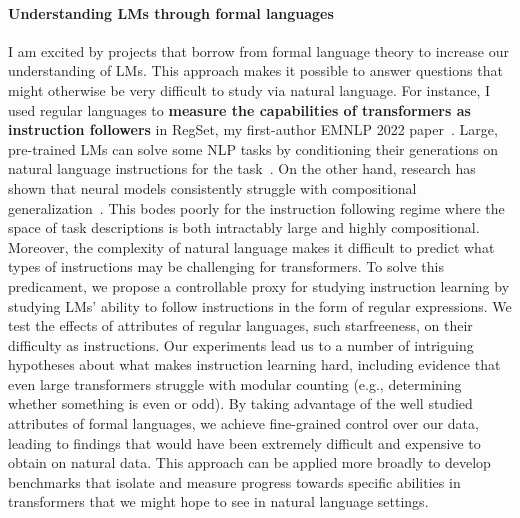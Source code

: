 \documentclass[11pt]{article}
\begin{document}
\paragraph{Understanding LMs through formal languages}

I am excited by projects 
that borrow from formal language theory
to increase our understanding of LMs.
This approach makes it possible to answer 
questions that might otherwise be very difficult to study via natural language.
For instance, I used regular languages to 
\textbf{measure the capabilities of transformers as instruction followers}
in RegSet, my first-author EMNLP 2022 paper~\cite{Finlayson2022WhatMI}. 
Large, pre-trained LMs can solve some NLP tasks 
by conditioning their generations on natural language instructions 
for the task~\cite{mishra2021crosstask, Wei2021FinetunedLM}. 
On the other hand, 
research has shown that neural models consistently struggle with
compositional generalization~\cite{Lake2018GeneralizationWS}. 
This bodes poorly for the instruction following regime
where the space of task descriptions is both intractably large 
and highly compositional.
Moreover, the complexity of natural language makes it difficult to
predict what types of instructions may be challenging for transformers.
To solve this predicament, 
we propose a controllable proxy for studying instruction learning
by studying LMs' ability to follow instructions in the form of regular expressions.
We test the effects of attributes of regular languages,
such starfreeness, on their difficulty as instructions.
Our experiments lead us to a number of intriguing hypotheses 
about what makes instruction learning hard, 
including evidence that even large transformers struggle with modular counting 
(e.g., determining whether something is even or odd). 
By taking advantage of the well studied attributes of formal languages,
we achieve fine-grained control over our data, leading to findings that
would have been extremely difficult and expensive to obtain on natural data.
This approach can be applied more broadly to develop benchmarks 
that isolate and measure progress towards specific abilities 
in transformers that we might hope to see in natural language settings.
\end{document}
